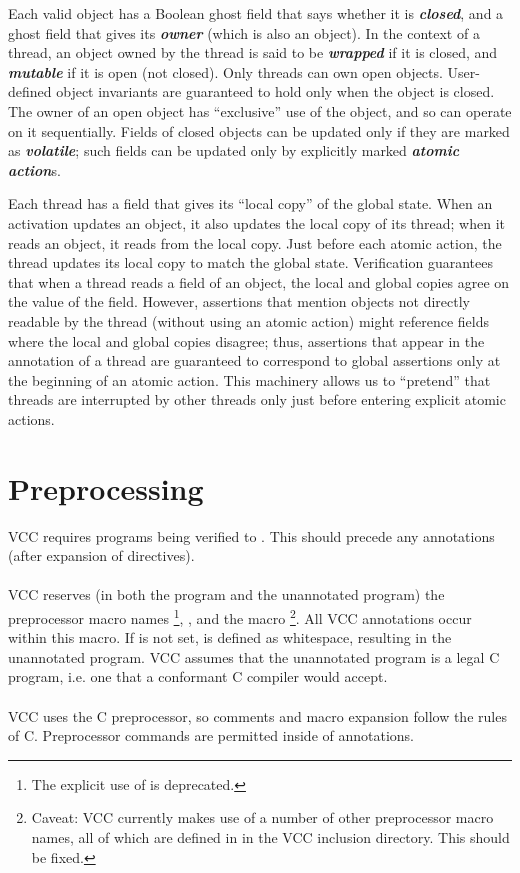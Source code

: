 \documentclass[preprint,nocopyrightspace]{sigplanconf}
\newcommand{\Def}[1]{\textit{\textbf{#1}}}
\begin{document}
Each valid object has a Boolean ghost field that says whether it
is \Def{closed}, and a ghost field that gives its \Def{owner} (which
is also an object). In the context of a thread, an object owned by the
thread is said to be \Def{wrapped} if it is closed, and \Def{mutable}
if it is open (not closed). Only threads can own open objects.
User-defined object invariants are guaranteed to hold only when the
object is closed. The owner of an open object has ``exclusive'' use of
the object, and so can operate on it sequentially.  Fields of closed
objects can be updated only if they are marked as \Def{volatile}; such
fields can be updated only by explicitly marked \Def{atomic action}s.

Each thread has a field that gives its ``local copy'' of the global state.
When an activation updates an object, it also updates the local copy
of its thread; when it reads an object, it reads from the local copy. 
Just before each atomic action, the thread updates its local copy to
match the global state. Verification guarantees that when a thread
reads a field of an object, the local and global copies agree on the
value of the field. However, assertions that mention objects not
directly readable by the thread (without using an atomic action) might
reference fields where the local and global copies disagree; thus,
assertions that appear in the annotation of a thread are guaranteed to
correspond to global assertions only at the beginning of an atomic
action. This machinery allows us to ``pretend'' that threads are
interrupted by other threads only just before entering explicit atomic
actions. 

\section{Preprocessing}

VCC requires programs being verified to . This
should precede any annotations (after expansion of 
directives). 
\\\\
VCC reserves (in both the program and the unannotated program) the
preprocessor macro names \footnote{ The explicit use
of  is deprecated.  }, , and the
macro \footnote{ Caveat: VCC currently makes use of a
number of other preprocessor macro names, all of which are defined
in  in the VCC inclusion directory. This should be
fixed.  }.  All VCC annotations occur within this
macro. If  is not set, \vcc{_()} is defined as whitespace,
resulting in the unannotated program. VCC assumes that the unannotated
program is a legal C program, i.e. one that a conformant C compiler
would accept.
\\\\
VCC uses the C preprocessor, so comments and macro expansion follow
the rules of C. Preprocessor commands are permitted inside of annotations.
\end{document}
